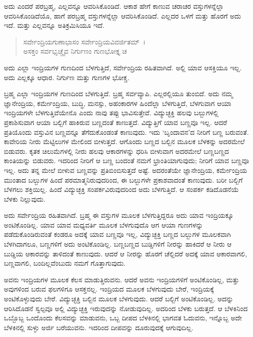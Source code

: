 ಅದು ಎಂದರೆ ಪರಬ್ರಹ್ಮ, ಎಲ್ಲವನ್ನೂ ಆವರಿಸಿಕೊಂಡಿದೆ. ಆಕಾಶ ಹೇಗೆ ಕಾಣುವ ಚರಾಚರ ವಸ್ತುಗಳನ್ನೆಲ್ಲಾ ಆವರಿಸಿಕೊಂಡಿದೆಯೊ, ಹಾಗೆ ಪರಬ್ರಹ್ಮ ವಸ್ತುಗಳನ್ನೆಲ್ಲಾ ಆವರಿಸಿಕೊಂಡಿದೆ. ಎಲ್ಲದರ ಒಳಗೆ ಮತ್ತು ಹೊರಗೆ ಅದು ಇದೆ. ಮತ್ತು ಎಲ್ಲವನ್ನೂ ಅತಿಕ್ರಮಿಸಿಯೂ ಇದೆ.

\begin{verse}
ಸರ್ವೇಂದ್ರಿಯಗುಣಾಭಾಸಂ ಸರ್ವೇಂದ್ರಿಯವಿವರ್ಜಿತಮ್~।\\ಅಸಕ್ತಂ ಸರ್ವಭೃಚ್ಚೈವ ನಿರ್ಗುಣಂ ಗುಣಭೋಕ್ತೃ ಚ 
\end{verse}

{\small ಅದು ಎಲ್ಲಾ ಇಂದ್ರಿಯಗಳ ಗುಣದಿಂದ ಬೆಳಗುತ್ತಿದೆ, ಸರ್ವೇಂದ್ರಿಯ ರಹಿತವಾಗಿದೆ. ಅಲ್ಲಿ ಯಾವ ಆಸಕ್ತಿಯೂ ಇಲ್ಲ. ಅದು ಎಲ್ಲಕ್ಕೂ ಆಧಾರ. ನಿರ್ಗುಣ ಮತ್ತು ಗುಣಗಳ ಭೋಕ್ಚ.}

ಬ್ರಹ್ಮ ಎಲ್ಲಾ ಇಂದ್ರಿಯಗಳ ಗುಣದಿಂದ ಬೆಳಗುತ್ತಿದೆ. ಬ್ರಹ್ಮ ಸರ್ವವ್ಯಾಪಿ. ಎಲ್ಲರಲ್ಲಿಯೂ ತುಂಬಿದೆ. ಅದು ನಮ್ಮ ಜ್ಞಾನೇಂದ್ರಿಯ, ಕರ್ಮೇಂದ್ರಿಯ, ಬುದ್ಧಿ, ಮನಸ್ಸು, ಅಹಂಕಾರಗಳ ಹಿಂದೆಲ್ಲಾ ಬೆಳಗುತ್ತಿದೆ, ಬೆಳಗುವಾಗ ಆಯಾ ಇಂದ್ರಿಯಗಳೇ ಬೆಳಗುತ್ತಿವೆಯೇನೊ ಎಂದು ನಾವು ತಪ್ಪು ಭಾವಿಸುತ್ತೇವೆ. ವಿದ್ಯುಚ್ಛಕ್ತಿ ಹಲವು ಬಲ್ಬುಗಳಲ್ಲಿ ಪ್ರಕಾಶಿಸುವಾಗ ಆಯಾ ಬಲ್ಬಿಗೆ ಹಾಕಿರುವ ಬಣ್ಣದಂತೆ ಕಾಣುತ್ತದೆ. ವಿದ್ಯುತ್ತಿಗೆ ಯಾವ ಬಣ್ಣವೂ ಇಲ್ಲ. ಆದರೆ ಪ್ರತಿಯೊಂದು ವಸ್ತುವಿನ ಬಣ್ಣವನ್ನೂ ತೆಗೆದುಕೊಂಡಂತೆ ಕಾಣುವುದು. ಇದು ‘ಬೃಂದಾವನ’ದ ನೀರಿಗೆ ಬಣ್ಣ ಬರುವಂತೆ. ಕಾವೇರಿಯ ನೀರು ಮೆಟ್ಟಿಲುಗಳ ಮೇಲಿಂದ ಬೀಳುತ್ತದೆ. ಆಗೊಂದು ಬಣ್ಣದ ಬಲ್ಬಿನ ಮೂಲಕ ಬೆಳಕನ್ನು ಅದರಮೇಲೆ ಬಿಡುವರು. ಕೃತಕ ಚಿಲುಮೆಗಳಲ್ಲಿ ನೀರು ಹಲವು ಆಕಾರಗಳನ್ನು ಧರಿಸಿ ಬೀಳುವಾಗ ಅದರಮೇಲೆ ಬಣ್ಣಬಣ್ಣದ ಕಾಂತಿಯನ್ನು ಬಿಡುವರು. ಇದರಿಂದ ನೀರಿಗೆ ಆ ಬಣ್ಣ ಬಂದಂತೆ ನಮಗೆ ಭ್ರಾಂತಿಯಾಗುವುದು; ನೀರಿಗೆ ಯಾವ ಬಣ್ಣವೂ ಇಲ್ಲ. ಅದು ತನ್ನ ಮೇಲೆ ಬೀಳುವ ಬಣ್ಣವನ್ನು ಪ್ರತಿಬಿಂಬಿಸುತ್ತದೆ ಅಷ್ಟೆ. ಅದರಂತೆಯೇ ಜ್ಞಾನೇಂದ್ರಿಯ, ಕರ್ಮೇಂದ್ರಿಯ ಮುಂತಾದ ಬಲ್ಬುಗಳ ಹಿಂದೆ ಪರಮಾತ್ಮನಿರುವುದರಿಂದ, ಈ ಬಲ್ಬುಗಳೇ ಪ್ರಕಾಶವಾದಂತೆ ಕಾಣುವುದು. ಬರೀ ಬಲ್ಬಿಗೆ ಬೆಳಗಲು ಶಕ್ತಿಯಿಲ್ಲ. ಹಿಂದೆ ವಿದ್ಯುಚ್ಛಕ್ತಿ ಸಂಪರ್ಕವಿರುವುದರಿಂದ ಅದು ಬೆಳಗುತ್ತಿದೆ. ಆ ಸಂಪರ್ಕ ಕಡಿದೊಡನೆಯೆ ಬೆಳಕು ನಿಲ್ಲುವುದು.

ಅದು ಸರ್ವೇಂದ್ರಿಯ ರಹಿತವಾಗಿದೆ. ಬ್ರಹ್ಮ ಈ ವಸ್ತುಗಳ ಮೂಲಕ ಬೆಳಗುತ್ತಿದ್ದರೂ ಅದು ಯಾವ ಇಂದ್ರಿಯಕ್ಕೂ ಅಂಟಿಕೊಂಡಿಲ್ಲ. ಯಾವ ಯಾವ ಮಧ್ಯವರ್ತಿ ಮೂಲಕ ಬೆಳಗುವುದೊ ಆಗ ಆಯಾ ಗುಣಗಳನ್ನು ಪಡೆದುಕೊಂಡಿರುವಂತೆ ಕಂಡರೂ ಅದಕ್ಕೆ ಯಾವ ಬಣ್ಣವೂ ಇಲ್ಲ, ವಿದ್ಯುಚ್ಛಕ್ತಿ ಬಣ್ಣದ ಬಲ್ಬುಗಳ ಮೂಲಕವಾಗಿ ಬೆಳಗಿದಾಗಲೂ, ಬಣ್ಣಗಳಿಗೆ ಅದು ಅಂಟಿಕೊಂಡಿಲ್ಲ. ಬಣ್ಣಬಣ್ಣದ ಬುಡ್ಡಿಗಳಿಗೆ ನೀರನ್ನು ಹಾಕಿದರೆ ಆ ನೀರು ಆ ಬುಡ್ಡಿಯ ಆಕಾರವನ್ನು ತಾಳಿದಂತೆ ಕಾಣುವುದು. ಆದರೆ ಆ ನೀರನ್ನು ಹೊರಗೆ ಚೆಲ್ಲಿದರೆ ಅದಕ್ಕೆ ಯಾವ ಆಕಾರವಾಗಲಿ, ಬಣ್ಣವಾಗಲಿ, ಬಂದಿಲ್ಲವೆಂಬುದು ನಮಗೆ ಗೊತ್ತಾಗುವುದು.

ಅವನು ಇಂದ್ರಿಯಗಳ ಮೂಲಕ ಕೆಲಸ ಮಾಡುತ್ತಿರುವನು. ಆದರೆ ಅವನು ಇಂದ್ರಿಯಗಳಿಗೆ ಅಂಟಿಕೊಂಡಿಲ್ಲ, ಮತ್ತು ಅವುಗಳಿಂದ ಬರುವ ಫಲಗಳಿಗೂ ಆಸಕ್ತನಲ್ಲ. ಇಂದ್ರಿಯದ ಮೂಲಕ ಬೆಳಗುವುದು ಬೇರೆ, ಇಂದ್ರಿಯಕ್ಕೆ ಅಂಟಿಕೊಳ್ಳುವುದು ಬೇರೆ. ವಿದ್ಯುಚ್ಛಕ್ತಿ ಬಲ್ಬಿನ ಮೂಲಕ ಬೆಳಗುವುದು. ಆದರೆ ಬಲ್ಬಿಗೆ ಅಂಟಿಕೊಂಡಿಲ್ಲ. ಅದನ್ನು ಆರಿಸಿದೊಡನೆ ಸ್ವಲ್ಪವೂ ಅಲ್ಲಿ ವಿದ್ಯುಚ್ಛಕ್ತಿ ಇರುವುದನ್ನು ನೋಡುವುದಿಲ್ಲ. ಅದರಿಂದ ಬೆಳಕು ಬರುತ್ತದೆ. ಆ ಬೆಳಕಿನಿಂದ ಒಬ್ಬೊಬ್ಬ ಒಂದೊಂದು ಕೆಲಸವನ್ನು ಮಾಡುವನು, ಒಬ್ಬ ದೀಪದ ಬೆಳಕಿನಲ್ಲಿ ಭಾಗವತ ಓದುವನು, ಇನ್ನೊಬ್ಬ ಅದೇ ಬೆಳಕಿನಲ್ಲಿ ಸುಳ್ಳು ಅರ್ಜಿ ಬರೆಯುವನು. ಇದರಿಂದ ದೀಪವನ್ನು ದೂರುವುದಕ್ಕೆ ಆಗುವುದಿಲ್ಲ.

